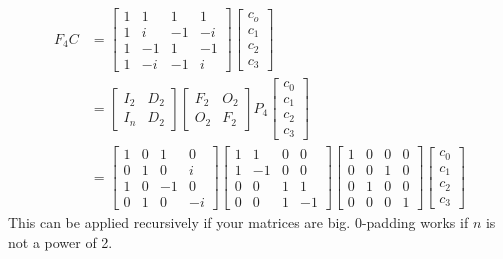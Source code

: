 \documentclass{article}
\begin{document}
    \begin{align*}
        F_4C &= \begin{bmatrix} 1&1&1&1 \\ 1&i&-1&-i \\ 1&-1&1&-1 \\ 1&-i&-1&i \end{bmatrix} \begin{bmatrix} c_o \\ c_1 \\c_2 \\ c_3 \end{bmatrix} \\
        &= \begin{bmatrix} I_2 & D_{2} \\ I_n & D_{2} \end{bmatrix} \begin{bmatrix} F_2 & O_2 \\ O_2 & F_2 \end{bmatrix} P_4 \begin{bmatrix} c_0 \\ c_1 \\ c_2 \\ c_3 \end{bmatrix} \\
        &= \begin{bmatrix} 1&0&1&0\\0&1&0&i\\1&0&-1&0\\0&1&0&-i \end{bmatrix} \begin{bmatrix} 1&1&0&0 \\ 1&-1&0&0 \\ 0&0&1&1 \\ 0&0&1&-1 \end{bmatrix} \begin{bmatrix} 1&0&0&0\\0&0&1&0\\0&1&0&0\\0&0&0&1 \end{bmatrix} \begin{bmatrix} c_0 \\ c_1 \\ c_2 \\ c_3 \end{bmatrix}
    \end{align*}
    This can be applied recursively if your matrices are big. 0-padding works if $n$ is not a power of 2.

\medskip
{}
\end{document}
